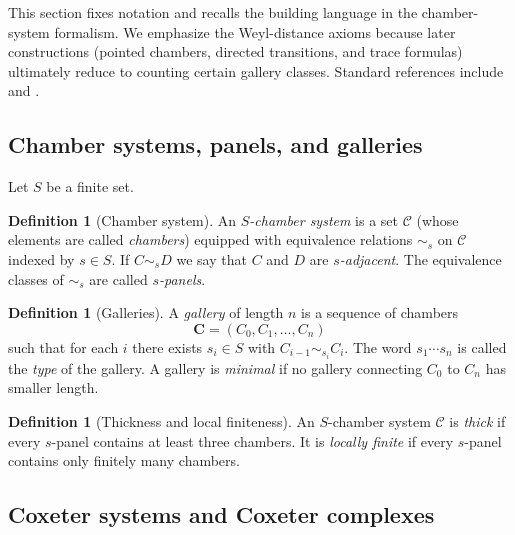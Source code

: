 \documentclass[11pt]{amsart}
\theoremstyle{definition}
\newtheorem{definition}[thm]{Definition}
\theoremstyle{remark}
\numberwithin{equation}{section}
\begin{document}
This section fixes notation and recalls the building language in the chamber-system formalism.
We emphasize the Weyl-distance axioms because later constructions (pointed chambers, directed transitions,
and trace formulas) ultimately reduce to counting certain gallery classes.
Standard references include \cite{AbramenkoBrown} and \cite{Ronan}.

\subsection{Chamber systems, panels, and galleries}\label{subsec:chamber-system}

Let $S$ be a finite set.

\begin{definition}[Chamber system]\label{def:chamber-system}
An \emph{$S$-chamber system} is a set $\mathcal{C}$ (whose elements are called \emph{chambers})
equipped with equivalence relations $\sim_s$ on $\mathcal{C}$ indexed by $s\in S$.
If $C\sim_s D$ we say that $C$ and $D$ are \emph{$s$-adjacent}.
The equivalence classes of $\sim_s$ are called \emph{$s$-panels}.
\end{definition}

\begin{definition}[Galleries]\label{def:galleries}
A \emph{gallery} of length $n$ is a sequence of chambers
\[
\mathbf{C}=(C_0,C_1,\ldots,C_{n})
\]
such that for each $i$ there exists $s_i\in S$ with $C_{i-1}\sim_{s_i} C_i$.
The word $s_1\cdots s_n$ is called the \emph{type} of the gallery.
A gallery is \emph{minimal} if no gallery connecting $C_0$ to $C_n$ has smaller length.
\end{definition}

\begin{definition}[Thickness and local finiteness]\label{def:thickness-localfiniteness}
An $S$-chamber system $\mathcal{C}$ is \emph{thick} if every $s$-panel contains at least three chambers.
It is \emph{locally finite} if every $s$-panel contains only finitely many chambers.
\end{definition}

\subsection{Coxeter systems and Coxeter complexes}\label{subsec:coxeter}
\end{document}

